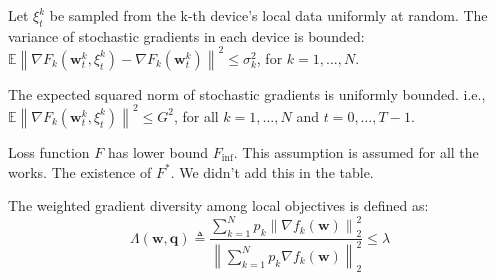 
\begin{assumption}
Let $\xi_{t}^{k}$ be sampled from the k-th device's local data uniformly at random. The variance of stochastic gradients in each device is bounded:
$\mathbb{E}\left\|\nabla F_{k}\left(\mathbf{w}_{t}^{k}, \xi_{t}^{k}\right)-\nabla F_{k}\left(\mathbf{w}_{t}^{k}\right)\right\|^{2} \leq \sigma_{k}^{2}$, for $k = 1,..., N$.
\label{ass:lgradvar}
\end{assumption}

\begin{assumption}
The expected squared norm of stochastic gradients is uniformly bounded. i.e.,
$\mathbb{E}\left\|\nabla F_{k}\left(\mathbf{w}_{t}^{k}, \xi_{t}^{k}\right)\right\|^{2} \leq G^{2}$, for all $k = 1,..., N$ and $t=0, \dots, T-1$.
\label{ass:squaregrad}
\end{assumption}

\begin{assumption}
	Loss function $F$ has lower bound $F_{\inf}$. This assumption is assumed for all the works.  The existence of $F^*$. We didn't add this 
	in the table.
	\label{ass:flb}
\end{assumption}

\begin{assumption}
	The weighted gradient diversity among local objectives is defined as:
$$
\Lambda(\boldsymbol{w}, \boldsymbol{q}) \triangleq \frac{\sum_{k=1}^{N} p_{k}\left\|\nabla f_{k}(\boldsymbol{w})\right\|_{2}^{2}}{\left\|\sum_{k=1}^{N} p_{k} \nabla f_{k}(\boldsymbol{w})\right\|_{2}^{2}} \leq \lambda
$$
\label{ass:bgd}
\end{assumption}

